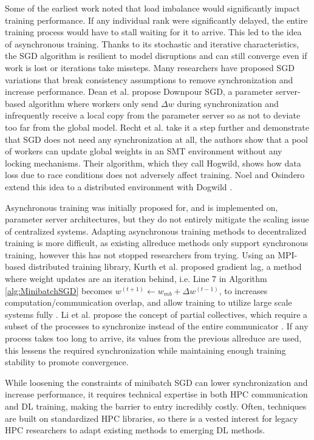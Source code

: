 Some of the earliest work noted that load imbalance would significantly impact training performance. 
If any individual rank were significantly delayed, the entire training process would have to stall waiting for it to arrive.
This led to the idea of asynchronous training.
Thanks to its stochastic and iterative characteristics, the \gls{SGD} algorithm is resilient to model disruptions and can still converge even if work is lost or iterations take missteps.
Many researchers have proposed \gls{SGD} variations that break consistency assumptions to remove synchronization and increase performance.
Dean et al. \cite{Dean2012DistBelif} propose Downpour \gls{SGD}, a parameter server-based algorithm where workers only send $\Delta w$ during synchronization and infrequently receive a local copy from the parameter server so as not to deviate too far from the global model. 
Recht et al. \cite{Recht2011HogWild} take it a step further and demonstrate that \gls{SGD} does not need any synchronization at all, the authors show that a pool of workers can update global weights in an \gls{SMT} environment without any locking mechanisms.
Their algorithm, which they call Hogwild, shows how data loss due to race conditions does not adversely affect training.
Noel and Osindero extend this idea to a distributed environment with Dogwild \cite{Noel2014Dogwild}.

Asynchronous training was initially proposed for, and is implemented on, parameter server architectures, but they do not entirely mitigate the scaling issue of centralized systems.
Adapting asynchronous training methods to decentralized training is more difficult, as existing allreduce methods only support synchronous training, however this has not stopped researchers from trying.
Using an \gls{MPI}-based distributed training library, Kurth et al. proposed gradient lag, a method where weight updates are an iteration behind, i.e. Line 7 in Algorithm \ref{alg:MinibatchSGD} becomes $w^{(t+1)}\leftarrow w_{mb} + \Delta w^{(t-1)}$, to increases computation/communication overlap, and allow training to utilize large scale systems fully \cite{Kurth2018ExascaleDLClimate}.
Li et al. propose the concept of partial collectives, which require a subset of the processes to synchronize instead of the entire communicator \cite{Li2020DLPartialColl}.
If any process takes too long to arrive, its values from the previous allreduce are used, this lessens the required synchronization while maintaining enough training stability to promote convergence.

While loosening the constraints of minibatch \gls{SGD} can lower synchronization and increase performance, it requires technical expertise in both \gls{HPC} communication and \gls{DL} training, making the barrier to entry incredibly costly.
Often, techniques are built on standardized \gls{HPC} libraries, so there is a vested interest for legacy \gls{HPC} researchers to adapt existing methods to emerging \gls{DL} methods.

